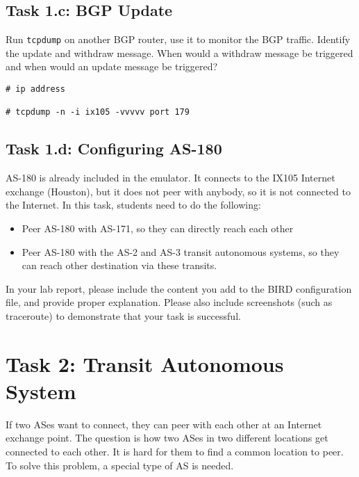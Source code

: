 \subsection{Task 1.c: BGP Update} 

Run \texttt{tcpdump} on another BGP router, use it to monitor the BGP traffic.
Identify the update and withdraw message. When would a withdraw message be 
triggered and when would an update message be triggered? 

\begin{lstlisting}
# ip address

# tcpdump -n -i ix105 -vvvvv port 179
\end{lstlisting}
 
\subsection{Task 1.d: Configuring AS-180} 

AS-180 is already included in the emulator. It connects to the
IX105 Internet exchange (Houston), but it does not peer with anybody, 
so it is not connected to the Internet. 
In this task, students need to do the following:

\begin{itemize}[noitemsep]
  \item Peer AS-180 with AS-171, so they can directly reach each other
  \item Peer AS-180 with the AS-2 and AS-3 transit autonomous systems, so they can
    reach other destination via these transits.
\end{itemize}


In your lab report, please include the content you add to the 
BIRD configuration file, and provide proper explanation.
Please also include screenshots (such as traceroute) to demonstrate 
that your task is successful. 


\section{Task 2: Transit Autonomous System} 

If two ASes want to connect, they can peer with each other
at an Internet exchange point. The question is how two ASes in two different locations
get connected to each other. It is hard for them
to find a common location to peer. To solve this problem,
a special type of AS is needed.

